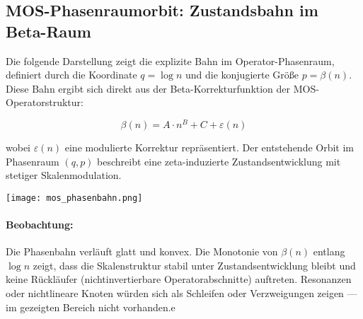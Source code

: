 \subsection*{MOS-Phasenraumorbit: Zustandsbahn im Beta-Raum}

Die folgende Darstellung zeigt die explizite Bahn im Operator-Phasenraum, definiert durch die Koordinate $q = \log n$ und die konjugierte Größe $p = \beta(n)$. Diese Bahn ergibt sich direkt aus der Beta-Korrekturfunktion der MOS-Operatorstruktur:

\[
\beta(n) = A \cdot n^B + C + \varepsilon(n)
\]

wobei $\varepsilon(n)$ eine modulierte Korrektur repräsentiert. Der entstehende Orbit im Phasenraum $(q, p)$ beschreibt eine zeta-induzierte Zustandsentwicklung mit stetiger Skalenmodulation.

\begin{center}
\texttt{[image: mos\_phasenbahn.png]}
\end{center}

\paragraph{Beobachtung:} Die Phasenbahn verläuft glatt und konvex. Die Monotonie von $\beta(n)$ entlang $\log n$ zeigt, dass die Skalenstruktur stabil unter Zustandsentwicklung bleibt und keine Rückläufer (nichtinvertierbare Operatorabschnitte) auftreten. Resonanzen oder nichtlineare Knoten würden sich als Schleifen oder Verzweigungen zeigen — im gezeigten Bereich nicht vorhanden.e